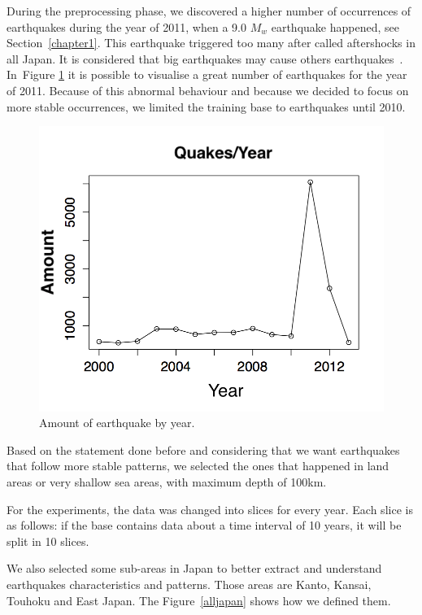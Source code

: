 During the preprocessing phase, we discovered a higher number of
occurrences of earthquakes during the year of 2011, when a 9.0 $M_w$
earthquake happened, see Section~\ref{chapter1}. This earthquake
triggered too many after called aftershocks in all Japan. It is
considered that big earthquakes may cause others
earthquakes~\cite{zhuang2004analyzing}. In~Figure \ref{ocorrenciasAno}
it is possible to visualise a great number of earthquakes for the year
of 2011. Because of this abnormal behaviour and because we decided to
focus on more stable occurrences, we limited the training base to
earthquakes until 2010.

\begin{figure}[]
\centering
\includegraphics[scale=0.5]{img/ocorrenciasAno.png}
\caption{Amount of earthquake by year.}
\label{ocorrenciasAno}
\end{figure}


Based on the statement done before and considering that we want
earthquakes that follow more stable patterns, we selected the ones
that happened in land areas or very shallow sea areas, with maximum
depth of 100km.

For the experiments, the data was changed into slices for every
year. Each slice is as follows: if the base contains data about a time
interval of 10 years, it will be split in 10 slices.

We also selected some sub-areas in Japan to better extract and
understand earthquakes characteristics and patterns. Those areas are
Kanto, Kansai, Touhoku and East Japan. The Figure~\ref{alljapan} shows
how we defined them.

